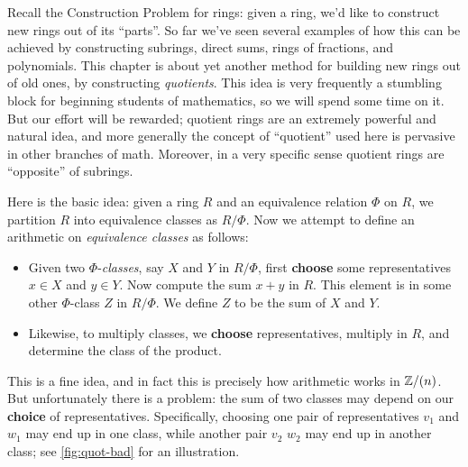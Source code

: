 Recall the Construction Problem for rings: given a ring, we'd like to construct new rings out of its ``parts''. So far we've seen several examples of how this can be achieved by constructing subrings, direct sums, rings of fractions, and polynomials. This chapter is about yet another method for building new rings out of old ones, by constructing \emph{quotients}. This idea is very frequently a stumbling block for beginning students of mathematics, so we will spend some time on it. But our effort will be rewarded; quotient rings are an extremely powerful and natural idea, and more generally the concept of ``quotient'' used here is pervasive in other branches of math. Moreover, in a very specific sense quotient rings are ``opposite'' of subrings.

Here is the basic idea: given a ring \(R\) and an equivalence relation \(\Phi\) on \(R\), we partition \(R\) into equivalence classes as \(R/\Phi\). Now we attempt to define an arithmetic on \emph{equivalence classes} as follows:
\begin{itemize}
\item Given two \(\Phi\)-\emph{classes}, say \(X\) and \(Y\) in \(R/\Phi\), first \textbf{choose} some representatives \(x \in X\) and \(y \in Y\). Now compute the sum \(x+y\) in \(R\). This element is in some other \(\Phi\)-class \(Z\) in \(R/\Phi\). We define \(Z\) to be the sum of \(X\) and \(Y\).
\item Likewise, to multiply classes, we \textbf{choose} representatives, multiply in \(R\), and determine the class of the product.
\end{itemize}
This is a fine idea, and in fact this is precisely how arithmetic works in \(\mathbb{Z}/(n)\). But unfortunately there is a problem: the sum of two classes may depend on our \textbf{choice} of representatives. Specifically, choosing one pair of representatives \(v_1\) and \(w_1\) may end up in one class, while another pair \(v_2\) \(w_2\) may end up in another class; see \autoref{fig:quot-bad} for an illustration.

